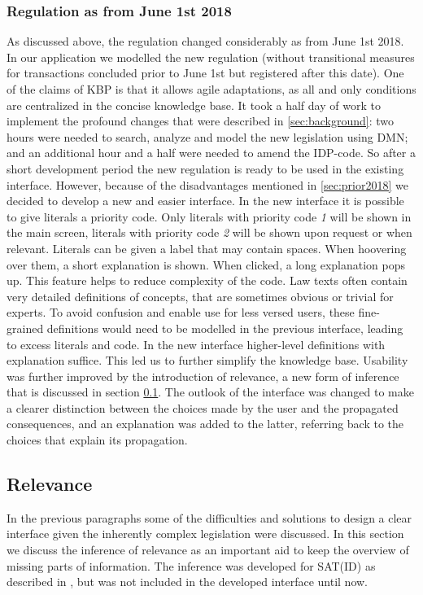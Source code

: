 \subsubsection{Regulation as from June 1st 2018}
As discussed above, the regulation changed considerably as from June 1st 2018.
In our application we modelled the new regulation (without transitional measures for transactions concluded prior to June 1st but registered after this date).
One of the claims of KBP is that it allows agile adaptations, as all and only conditions are centralized in the concise knowledge base.
It took a half day of work to implement the profound changes that were described in \ref{sec:background}: two hours were needed to search, analyze and model the new legislation using DMN; and an additional hour and a half were needed to amend the IDP-code. %
So after a short development period the new regulation is ready to be used in the existing interface.
However, because of the disadvantages mentioned in \ref{sec:prior2018} we decided to develop a new and easier interface.
In the new interface it is possible to give literals a priority code.
Only literals with priority code \textit{1} will be shown in the main screen, literals with priority code \textit{2} will be shown upon request or when relevant.
Literals can be given a label that may contain spaces.
When hoovering over them, a short explanation is shown.
When clicked, a long explanation pops up.
This feature helps to reduce complexity of the code.
Law texts often contain very detailed definitions of concepts, that are sometimes obvious or trivial for experts.
To avoid confusion and enable use for less versed users, these fine-grained definitions would need to be modelled in the previous interface, leading to excess literals and code.
In the new interface higher-level definitions with explanation suffice.
This led us to further simplify the knowledge base.
Usability was further improved by the introduction of relevance, a new form of inference that is discussed in section \ref{sec:relevance}.
The outlook of the interface was changed to make a clearer distinction between the choices made by the user and the propagated consequences, and an explanation was added to the latter, referring back to the choices that explain its propagation.

\subsection{Relevance}
\label{sec:relevance}
In the previous paragraphs some of the difficulties and solutions to design a clear interface given the inherently complex legislation were discussed.
In this section we discuss the inference of relevance as an important aid to keep the overview of missing parts of information.
The inference was developed for SAT(ID) as described in \cite{Jansen2016}, but was not included in the developed interface until now.

